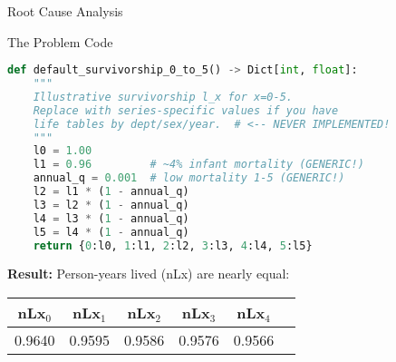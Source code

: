 \documentclass[aspectratio=169]{beamer}
\begin{document}
\begin{frame}[fragile]{Root Cause Analysis}
\begin{block}{The Problem Code}
\begin{lstlisting}[language=Python, basicstyle=\ttfamily\scriptsize]
def default_survivorship_0_to_5() -> Dict[int, float]:
    """
    Illustrative survivorship l_x for x=0-5.
    Replace with series-specific values if you have 
    life tables by dept/sex/year.  # <-- NEVER IMPLEMENTED!
    """
    l0 = 1.00
    l1 = 0.96         # ~4% infant mortality (GENERIC!)
    annual_q = 0.001  # low mortality 1-5 (GENERIC!)
    l2 = l1 * (1 - annual_q)
    l3 = l2 * (1 - annual_q)
    l4 = l3 * (1 - annual_q)
    l5 = l4 * (1 - annual_q)
    return {0:l0, 1:l1, 2:l2, 3:l3, 4:l4, 5:l5}
\end{lstlisting}
\end{block}

\textbf{Result:} Person-years lived (nLx) are nearly equal:
\begin{center}
\begin{tabular}{cccccc}
\toprule
nLx$_0$ & nLx$_1$ & nLx$_2$ & nLx$_3$ & nLx$_4$ \\
\midrule
0.9640 & 0.9595 & 0.9586 & 0.9576 & 0.9566 \\
\bottomrule
\end{tabular}
\end{center}
\end{frame}
\end{document}
